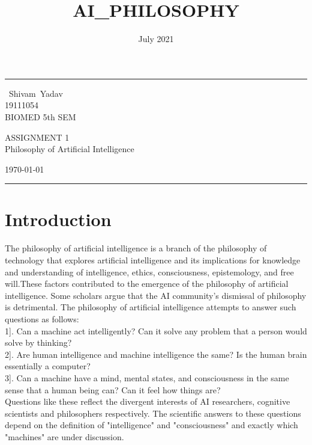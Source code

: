 \documentclass[a4paper,10pt]{article}
\title{AI_PHILOSOPHY}
\date{July 2021}
\begin{document}
    \fancyhead{}
    \hrule \medskip %
    \begin{minipage}{0.295\textwidth} 
    \raggedright
    \footnotesize
  Shivam Yadav\hfill\\
   19111054\hfill\\
   BIOMED 5th SEM
    \end{minipage}
    \begin{minipage}{0.4\textwidth} 
    \centering 
    \large 
    ASSIGNMENT 1\\
    \normalsize 
    Philosophy of Artificial Intelligence\\ 
    \end{minipage}
    \begin{minipage}{0.295\textwidth} 
    \raggedleft
    \today\hfill\\
    \end{minipage}
    \medskip\hrule 
    \bigskip
    
\section{Introduction}

The philosophy of artificial intelligence is a branch of the philosophy of technology that explores artificial intelligence and its implications for knowledge and understanding of intelligence, ethics, consciousness, epistemology, and free will.These factors contributed to the emergence of the philosophy of artificial intelligence. Some scholars argue that the AI community's dismissal of philosophy is detrimental.
The philosophy of artificial intelligence attempts to answer such questions as follows:\\
1]. Can a machine act intelligently? Can it solve any problem that a person would solve by thinking?\\
2]. Are human intelligence and machine intelligence the same? Is the human brain essentially a computer?\\
3]. Can a machine have a mind, mental states, and consciousness in the same sense that a human being can? Can it feel how things are?\\
Questions like these reflect the divergent interests of AI researchers, cognitive scientists and philosophers respectively. The scientific answers to these questions depend on the definition of "intelligence" and "consciousness" and exactly which "machines" are under discussion.
\end{document}
